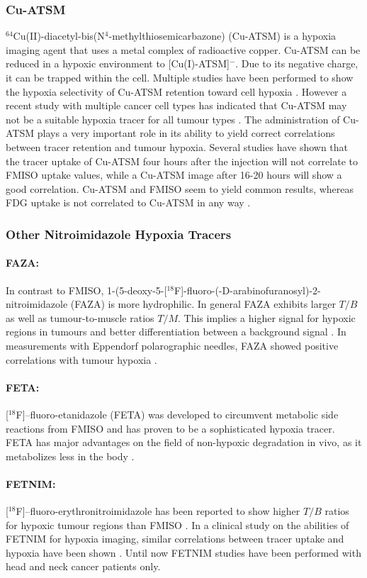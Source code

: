 \subsubsection{Cu-ATSM}
$^{64}$Cu(II)-diacetyl-bis(N$^4$-methylthiosemicarbazone) (Cu-ATSM) is a hypoxia imaging agent that uses a metal complex of radioactive copper. Cu-ATSM can be reduced in a hypoxic environment to [Cu(I)-ATSM]$^-$. Due to its negative charge, it can be trapped within the cell. Multiple studies have been performed to show the hypoxia selectivity of Cu-ATSM retention toward cell hypoxia \cite{pmid9662602}. However a recent study with multiple cancer cell types has indicated that Cu-ATSM may not be a suitable hypoxia tracer for all tumour types \cite{pmid16741309}. The administration of Cu-ATSM plays a very important role in its ability to yield correct correlations between tracer retention and tumour hypoxia. Several studies have shown that the tracer uptake of Cu-ATSM four hours after the injection will not correlate to FMISO uptake values, while a Cu-ATSM image after 16-20 hours will show a good correlation. Cu-ATSM and FMISO seem to yield common results, whereas FDG uptake is not correlated to Cu-ATSM in any way \cite{pmid12831991}.
\subsubsection{Other Nitroimidazole Hypoxia Tracers}
\paragraph{FAZA: }In contrast to FMISO, 1-(5-deoxy-5-[$^{18}$F]-fluoro-(-D-arabinofuranosyl)-2- nitroimidazole (FAZA) is more hydrophilic. In general FAZA exhibits larger $T/B$ as well as tumour-to-muscle ratios $T/M$. This implies a higher signal for hypoxic regions in tumours and better differentiation between a background signal \cite{pmid12745023}. In measurements with Eppendorf polarographic needles, FAZA showed positive correlations with tumour hypoxia \cite{pmid18313528}.
\paragraph{FETA: }[$^{18}$F]--fluoro-etanidazole (FETA) was developed to circumvent metabolic side reactions from FMISO and has proven to be a sophisticated hypoxia tracer. FETA has major advantages on the field of non-hypoxic degradation in vivo, as it metabolizes less in the body \cite{pmid15150578}.
\paragraph{FETNIM: }[$^{18}$F]--fluoro-erythronitroimidazole has been reported to show higher $T/B$ ratios for hypoxic tumour regions than FMISO \cite{pmid7862981}. In a clinical study on the abilities of FETNIM for hypoxia imaging, similar correlations between tracer uptake and hypoxia have been shown \cite{pmid14722675}. Until now FETNIM studies have been performed with head and neck cancer patients only.
